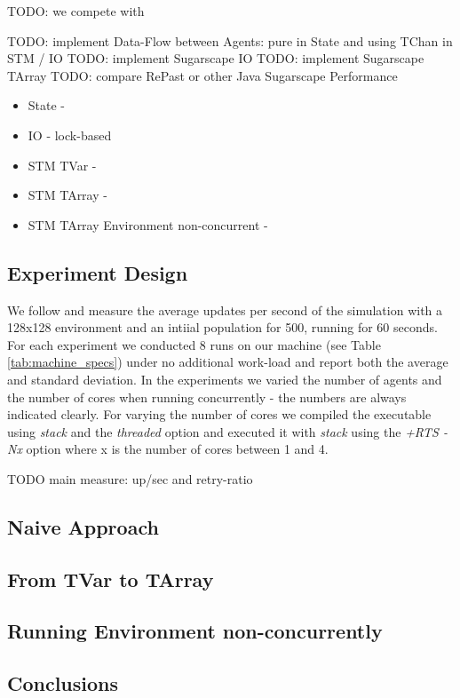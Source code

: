TODO: we compete with \cite{lysenko_framework_2008}

TODO: implement Data-Flow between Agents: pure in State and using TChan in STM / IO
TODO: implement Sugarscape IO
TODO: implement Sugarscape TArray
TODO: compare RePast or other Java Sugarscape Performance

\begin{itemize}
	\item State - 
	\item IO - lock-based
	\item STM TVar -
	\item STM TArray -
	\item STM TArray Environment non-concurrent -
\end{itemize}

\subsection{Experiment Design}
We follow \cite{lysenko_framework_2008} and measure the average updates per second of the simulation with a 128x128 environment and an intiial population for 500, running for 60 seconds. For each experiment we conducted 8 runs on our machine (see Table \ref{tab:machine_specs}) under no additional work-load and report both the average and standard deviation. In the experiments we varied the number of agents and the number of cores when running concurrently - the numbers are always indicated clearly. For varying the number of cores we compiled the executable using \textit{stack} and the \textit{threaded} option and executed it with \textit{stack} using the \textit{+RTS -Nx} option where x is the number of cores between 1 and 4. 

TODO main measure: up/sec and retry-ratio

\subsection{Naive Approach}

\subsection{From TVar to TArray}

\subsection{Running Environment non-concurrently}

\subsection{Conclusions}